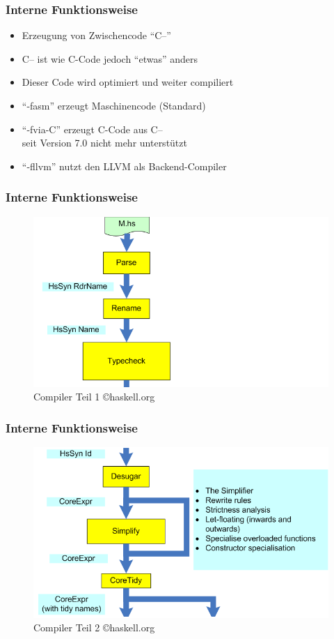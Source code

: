 \begin{frame}
\frametitle{Interne Funktionsweise}
\begin{block}{\vspace*{-3ex}}
\begin{itemize}
  \item Erzeugung von Zwischencode "`C--"'
  \item C-- ist wie C-Code jedoch "`etwas"' anders
  \item Dieser Code wird optimiert und weiter compiliert
  \item "`-fasm"' erzeugt Maschinencode (Standard)
  \item "`-fvia-C"' erzeugt C-Code aus C--\\
  		seit Version 7.0 nicht mehr unterstützt
  \item "`-fllvm"' nutzt den LLVM als Backend-Compiler
\end{itemize}
\end{block}
\end{frame}

\begin{frame}
\frametitle{Interne Funktionsweise}
\begin{figure}
\centering
\includegraphics*[scale=0.4]{images/HscPipe2_1}
\caption{Compiler Teil 1 \copyright haskell.org}
\end{figure}
\end{frame}


\begin{frame}
\frametitle{Interne Funktionsweise}
\begin{figure}
\centering
\includegraphics[scale=0.4]{images/HscPipe2_2.png}
\caption{Compiler Teil 2 \copyright haskell.org}
\end{figure}
\end{frame}

